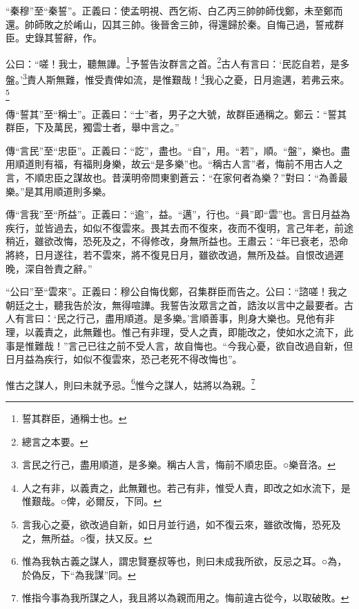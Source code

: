 {\noindent\shu{}\fzkt “秦穆”至“秦誓”。正義曰：使孟明視、西乞術、白乙丙三帥帥師伐鄭，未至鄭而還。帥師敗之於崤山，囚其三帥。後晉舍三帥，得還歸於秦。自悔己過，誓戒群臣。史錄其誓辭，作。 \par}

公曰：“嗟！我士，聽無譁。\footnote{誓其群臣，通稱士也。}予誓告汝群言之首。\footnote{總言之本要。}古人有言曰：‘民訖自若，是多盤。’\footnote{言民之行己，盡用順道，是多樂。稱古人言，悔前不順忠臣。○樂音洛。}責人斯無難，惟受責俾如流，是惟艱哉！\footnote{人之有非，以義責之，此無難也。若己有非，惟受人責，即改之如水流下，是惟艱哉。○俾，必爾反，下同。}我心之憂，日月逾邁，若弗云來。\footnote{言我心之憂，欲改過自新，如日月並行過，如不復云來，雖欲改悔，恐死及之，無所益。○復，扶又反。}


{\noindent\zhuan{}\fzbyks 傳“誓其”至“稱士”。正義曰：“士”者，男子之大號，故群臣通稱之。鄭云：“誓其群臣，下及萬民，獨雲士者，舉中言之。” \par}

{\noindent\zhuan{}\fzbyks 傳“言民”至“忠臣”。正義曰：“訖”，盡也。“自”，用。“若”，順。“盤”，樂也。盡用順道則有福，有福則身樂，故云“是多樂”也。“稱古人言”者，悔前不用古人之言，不順忠臣之謀故也。昔漢明帝問東劉蒼云：“在家何者為樂？”對曰：“為善最樂。”是其用順道則多樂。 \par}

{\noindent\zhuan{}\fzbyks 傳“言我”至“所益”。正義曰：“逾”，益。“邁”，行也。“員”即“雲”也。言日月益為疾行，並皆過去，如似不復雲來。畏其去而不復來，夜而不復明，言己年老，前途稍近，雖欲改悔，恐死及之，不得修改，身無所益也。王肅云：“年已衰老，恐命將終，日月遂往，若不雲來，將不復見日月，雖欲改過，無所及益。自恨改過遲晚，深自咎責之辭。” \par}

{\noindent\shu{}\fzkt “公曰”至“雲來”。正義曰：穆公自悔伐鄭，召集群臣而告之。公曰：“諮嗟！我之朝廷之士，聽我告於汝，無得喧譁。我誓告汝眾言之首，誥汝以言中之最要者。古人有言曰：‘民之行己，盡用順道。是多樂。’言順善事，則身大樂也。見他有非理，以義責之，此無難也。惟己有非理，受人之責，即能改之，使如水之流下，此事是惟難哉！”言己已往之前不受人言，故自悔也。“今我心憂，欲自改過自新，但日月益為疾行，如似不復雲來，恐己老死不得改悔也”。 \par}

惟古之謀人，則曰未就予忌。\footnote{惟為我執古義之謀人，謂忠賢蹇叔等也，則曰未成我所欲，反忌之耳。○為，於偽反，下“為我謀”同。}惟今之謀人，姑將以為親。\footnote{惟指今事為我所謀之人，我且將以為親而用之。悔前違古從今，以取破敗。}

